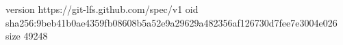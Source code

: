 version https://git-lfs.github.com/spec/v1
oid sha256:9beb41b0ae4359fb08608b5a52e9a29629a482356af126730d7fee7e3004e026
size 49248
